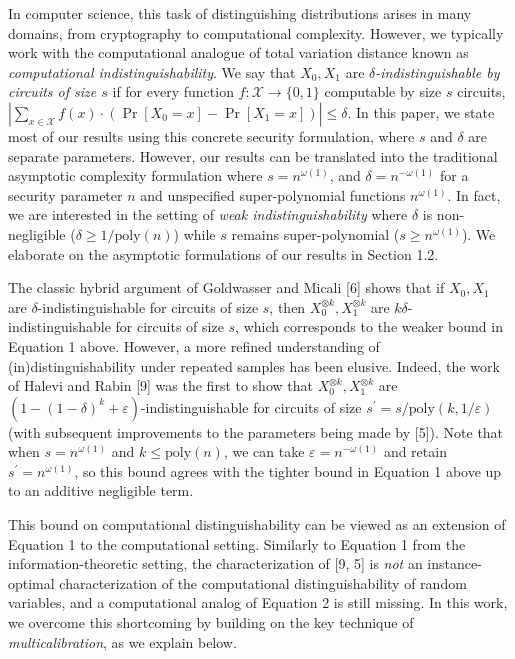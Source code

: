 In computer science, this task of distinguishing distributions arises in many domains, from cryptography to computational complexity. However, we typically work with the computational analogue of total variation distance known as \emph{computational indistinguishability}. We say that $X_{0},X_{1}$ are \emph{$\delta$-indistinguishable by circuits of size $s$} if for every function $f:\mathcal{X}\rightarrow\{0,1\}$ computable by size $s$ circuits, $|\sum_{x\in\mathcal{X}}f(x)\cdot(\Pr[X_{0}=x]-\Pr[X_{1}=x])|\leq\delta$. In this paper, we state most of our results using this concrete security formulation, where $s$ and $\delta$ are separate parameters. However, our results can be translated into the traditional asymptotic complexity formulation where $s=n^{\omega(1)}$, and $\delta=n^{-\omega(1)}$ for a security parameter $n$ and unspecified super-polynomial functions $n^{\omega(1)}$.
In fact, we are interested in the setting of \emph{weak indistinguishability} where $\delta$ is non-negligible ($\delta\geq 1/\mathrm{poly}(n)$) while $s$ remains super-polynomial ($s\geq n^{\omega(1)}$). We elaborate on the asymptotic formulations of our results in Section 1.2.\par




The classic hybrid argument of Goldwasser and Micali [6] shows that if $X_{0},X_{1}$ are $\delta$-indistinguishable for circuits of size $s$, then $X_{0}^{\otimes k},X_{1}^{\otimes k}$ are $k\delta$-indistinguishable for circuits of size $s$, which corresponds to the weaker bound in Equation 1 above. However, a more refined understanding of (in)distinguishability under repeated samples has been elusive. Indeed, the work of Halevi and Rabin [9] was the first to show that $X_{0}^{\otimes k},X_{1}^{\otimes k}$ are $(1-(1-\delta)^{k}+\varepsilon)$-indistinguishable for circuits of size $s^{\prime}=s/\mathrm{poly}(k,1/\varepsilon)$ (with subsequent improvements to the parameters being made by [5]). Note that when $s=n^{\omega(1)}$ and $k\leq\mathrm{poly}(n)$, we can take $\varepsilon=n^{-\omega(1)}$ and retain $s^{\prime}=n^{\omega(1)}$, so this bound agrees with the tighter bound in Equation 1 above up to an additive negligible term.\par




This bound on computational distinguishability can be viewed as an extension of Equation 1 to the computational setting. Similarly to Equation 1 from the information-theoretic setting, the characterization of [9, 5] is \emph{not} an instance-optimal characterization of the computational distinguishability of random variables, and a computational analog of Equation 2 is still missing. In this work, we overcome this shortcoming by building on the key technique of \emph{multicalibration}, as we explain below.\par




